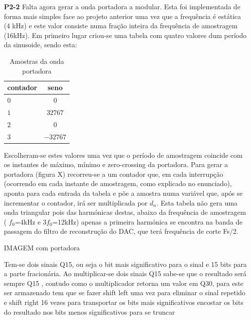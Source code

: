 \documentclass[11pt]{article}
\begin{document}
\vspace{2 mm}
\textbf{P2-2}
Falta agora gerar a onda portadora a modular. Esta foi implementada de forma mais simples face ao projeto anterior uma vez que a frequência é estática (4 kHz) e este valor consiste numa fração inteira da frequência de amostragem (16kHz).
Em primeiro lugar criou-se uma tabela com quatro valores dum período da sinusoide, sendo esta: %
\begin{table}[H]
	\centering
	\caption{Amostras da onda portadora}
	\label{tab:amostras}
	\begin{tabular}[c]{|l||c|}
		\hline \textbf{contador} & \textbf{seno}\\ 
		\hline $ 0 $ & $ 0 $\\ 
		\hline $ 1 $ & $ 32767 $  \\ 
		\hline $ 2 $ & $ 0 $ \\ 
		\hline $ 3 $ & $ -32767 $ \\
		\hline
	\end{tabular}
\end{table}

Escolheram-se estes valores uma vez que o período de amostragem coincide com os instantes de máximo, mínimo e zero-crossing da portadora. Para gerar a portadora (figura X) recorreu-se a um contador que, em cada interrupção (ocorrendo em cada instante de amostragem, como explicado no enunciado), aponta para cada entrada da tabela e põe a amostra numa variável que, após se incrementar o contador, irá ser multiplicada por $d_n$. Esta tabela não gera uma onda triangular pois das harmónicas destas, abaixo da frequência de amostragem ( $f_0$=4kHz e 3$f_0$=12kHz) apenas a primeira harmónica se encontra na banda de passagem do filtro de reconstrução do DAC, que terá frequência de corte Fs/2.

IMAGEM com portadora

Tem-se dois sinais Q15, ou seja o bit mais significativo para o sinal e 15 bits para a parte fracionária. Ao multiplicar-se dois sinais Q15 sabe-se que o resultado será sempre Q15
, contudo como o multiplicador retorna um valor em Q30, para este ser armazenado tem que se fazer shift left uma vez para eliminar o sinal repetido e shift right 16 vezes para transportar os bits mais significativos encostar os bits do resultado nos bits menos significativos para se truncar

\end{document}
